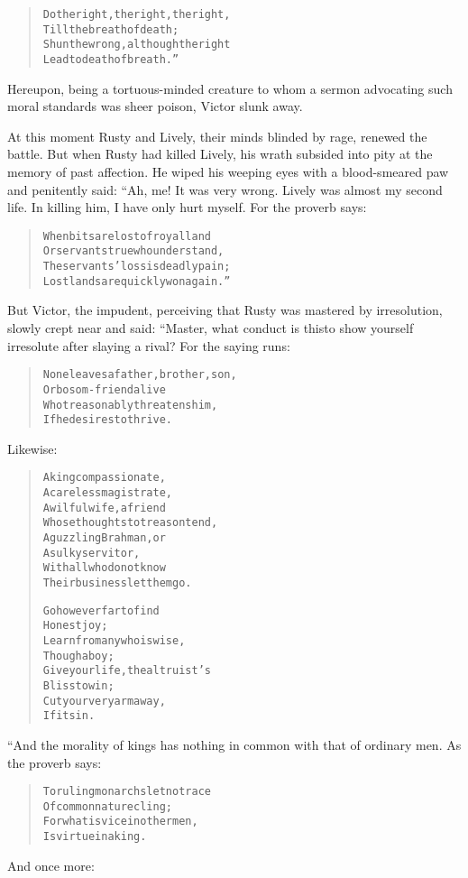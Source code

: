 \documentclass[article, twoside, 14pt]{memoir}
\renewenvironment{verbatim}{%
\begin{quote}%
\vskip -10pt%
\begin{alltt}\normalfont\large}{\end{alltt}%
\end{quote}%
\vskip -10pt
} %
\begin{document}
\begin{verbatim}
Do the right, the right, the right,
    Till the breath of death;
Shun the wrong, although the right
    Lead to death of breath.”
\end{verbatim}
Hereupon, being a tortuous-minded creature to whom a sermon
advocating such moral standards was sheer poison, Victor slunk
away.

At this moment Rusty and Lively, their minds blinded by rage,
renewed the battle. But when Rusty had killed Lively, his wrath
subsided into pity at the memory of past affection. He wiped his
weeping eyes with a blood-smeared paw and penitently said: “Ah, me!
It was very wrong. Lively was almost my second life. In killing
him, I have only hurt myself. For the proverb says:

\begin{verbatim}
When bits are lost of royal land
Or servants true who understand,
The servants' loss is deadly pain;
Lost lands are quickly won again.”
\end{verbatim}
But Victor, the impudent, perceiving that Rusty was mastered by
irresolution, slowly crept near and said: “Master, what conduct is
this{\textemdash}to show yourself irresolute after slaying a rival? For the
saying runs:

\begin{verbatim}
None leaves a father, brother, son,
    Or bosom-friend alive
Who treasonably threatens him,
    If he desires to thrive.
\end{verbatim}
Likewise:

\begin{verbatim}
A king compassionate,
A careless magistrate,
A wilful wife, a friend
Whose thoughts to treason tend,
A guzzling Brahman, or
A sulky servitor,
With all who do not know
Their business{\textemdash}let them go.

Go however far to find
    Honest joy;
Learn from any who is wise,
    Though a boy;
Give your life, the altruist's
    Bliss to win;
Cut your very arm away,
    If it sin.
\end{verbatim}
“And the morality of kings has nothing in common with that of
ordinary men. As the proverb says:

\begin{verbatim}
To ruling monarchs let no trace
    Of common nature cling;
For what is vice in other men,
    Is virtue in a king.
\end{verbatim}
And once more:
\end{document}
